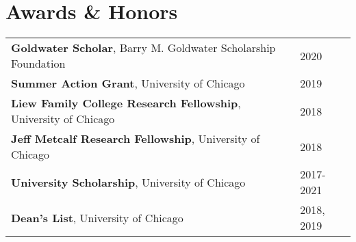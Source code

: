 \documentclass[letterpaper, 12pt]{article}
\begin{document}
\section{Awards \& Honors}
\begin{tabular}{@{} L{14cm} @{} R{2.51cm} @{}}
  \textbf{Goldwater Scholar}, Barry M. Goldwater Scholarship Foundation & 2020 \\
  \textbf{Summer Action Grant}, University of Chicago & 2019 \\
  \textbf{Liew Family College Research Fellowship}, University of Chicago & 2018 \\
  \textbf{Jeff Metcalf Research Fellowship}, University of Chicago & 2018 \\
  \textbf{University Scholarship}, University of Chicago & 2017-2021\\
  \textbf{Dean's List}, University of Chicago & 2018, 2019 \\
\end{tabular}
\vspace{0.2em}
\end{document}

